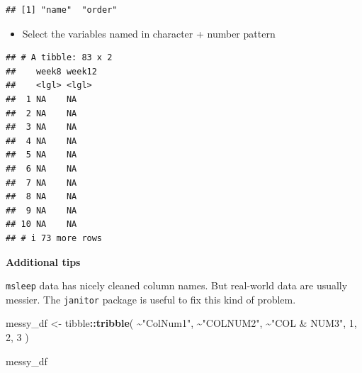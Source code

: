 \documentclass[
]{book}
\newenvironment{Shaded}{\begin{snugshade}}{\end{snugshade}}
\newcommand{\ConstantTok}[1]{\textcolor[rgb]{0.56,0.35,0.01}{#1}}
\newcommand{\DecValTok}[1]{\textcolor[rgb]{0.00,0.00,0.81}{#1}}
\newcommand{\FunctionTok}[1]{\textcolor[rgb]{0.13,0.29,0.53}{\textbf{#1}}}
\newcommand{\NormalTok}[1]{#1}
\newcommand{\OtherTok}[1]{\textcolor[rgb]{0.56,0.35,0.01}{#1}}
\newcommand{\SpecialCharTok}[1]{\textcolor[rgb]{0.81,0.36,0.00}{\textbf{#1}}}
\newcommand{\StringTok}[1]{\textcolor[rgb]{0.31,0.60,0.02}{#1}}
\providecommand{\tightlist}{%
  \setlength{\itemsep}{0pt}\setlength{\parskip}{0pt}}
\begin{document}
\begin{verbatim}
## [1] "name"  "order"
\end{verbatim}

\begin{itemize}
\tightlist
\item
  Select the variables named in character + number pattern
\end{itemize}

\begin{Shaded}
\end{Shaded}

\begin{verbatim}
## # A tibble: 83 x 2
##    week8 week12
##    <lgl> <lgl> 
##  1 NA    NA    
##  2 NA    NA    
##  3 NA    NA    
##  4 NA    NA    
##  5 NA    NA    
##  6 NA    NA    
##  7 NA    NA    
##  8 NA    NA    
##  9 NA    NA    
## 10 NA    NA    
## # i 73 more rows
\end{verbatim}

\textbf{Additional tips}

\texttt{msleep} data has nicely cleaned column names. But real-world data are usually messier. The \texttt{janitor} package is useful to fix this kind of problem.

\begin{Shaded}
\begin{Highlighting}[]
\NormalTok{messy\_df }\OtherTok{\textless{}{-}}\NormalTok{ tibble}\SpecialCharTok{::}\FunctionTok{tribble}\NormalTok{(}
  \SpecialCharTok{\textasciitilde{}}\StringTok{"ColNum1"}\NormalTok{, }\SpecialCharTok{\textasciitilde{}}\StringTok{"COLNUM2"}\NormalTok{, }\SpecialCharTok{\textasciitilde{}}\StringTok{"COL \& NUM3"}\NormalTok{,}
  \DecValTok{1}\NormalTok{, }\DecValTok{2}\NormalTok{, }\DecValTok{3}
\NormalTok{)}

\NormalTok{messy\_df}
\end{Highlighting}
\end{Shaded}
\end{document}
